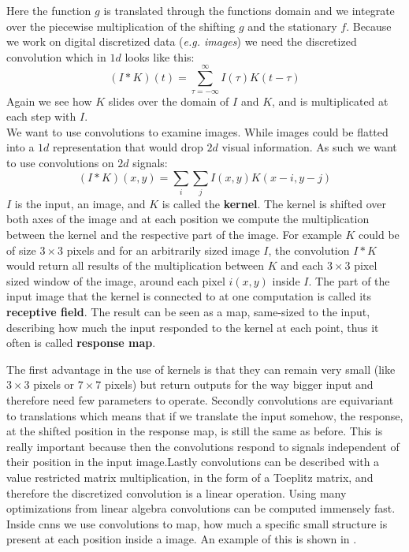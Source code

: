 Here the function $g$ is translated through the functions domain and we integrate over the piecewise multiplication of the shifting $g$ and the stationary $f$.
Because we work on digital discretized data (\textit{e.g. images}) we need the discretized convolution which in $1d$ looks like this:
\begin{equation}
    (I * K)(t)  = \sum_{\tau = - \infty}^\infty I(\tau)K(t - \tau)
\end{equation}
Again we see how $K$ slides over the domain of $I$ and $K$, and is multiplicated at each step with $I$.\\
We want to use convolutions to examine images. While images could be flatted into a $1d$ representation that would drop $2d$ visual information. As such we want to use convolutions on $2d$ signals:
\begin{equation}
    (I * K)(x,y)  = \sum_i\sum_j I(x,y)K(x-i,y-j)
\end{equation}
$I$ is the input, an image, and $K$ is called the \textbf{kernel}. The kernel is shifted over both axes of the image and at each position we compute the multiplication between the kernel and the respective part of the image. For example $K$ could be of size $3\times 3$ pixels and for an arbitrarily sized image $I$, the convolution $I * K$ would return all results of the multiplication between $K$ and each $3 \times 3$ pixel sized window of the image, around each pixel $i(x,y)$ inside $I$. The part of the input image that the kernel is connected to at one computation is called its \textbf{receptive field}. The result can be seen as  a map, same-sized to the input, describing how much the input responded to the kernel at each point, thus it often is called \textbf{response map}.

The first advantage in the use of kernels is that they can remain very small (like $3\times 3$ pixels or $7\times 7$ pixels) but return outputs for the way bigger input and therefore need few parameters to operate. Secondly convolutions are equivariant to translations which means that if we translate the input somehow, the response, at the shifted position in the response map, is still the same as before. This is really important because then the convolutions respond to signals independent of their position in the input image.Lastly convolutions can be described with a value restricted matrix multiplication, in the form of a Toeplitz matrix, and therefore the discretized convolution is a linear operation. Using many optimizations from linear algebra convolutions can be computed immensely fast.\\
Inside \glspl{cnn} we use convolutions to map, how much a specific small structure is present at each position inside a image. An example of this is shown in .

